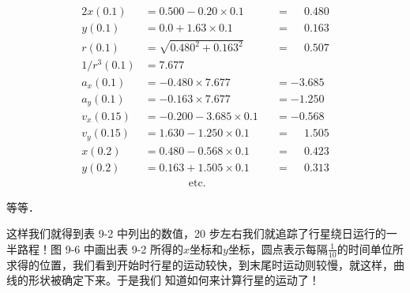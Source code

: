 \documentclass[12pt,oneside]{book}
\begin{document}
\begin{alignat*}{2}
x(0.1)&=0.500-0.20 \times 0.1&&=\phantom{-}0.480\\[.5ex]
y(0.1)&=0.0+1.63 \times 0.1 &&=\phantom{-}0.163\\[.5ex]
r(0.1)&=\sqrt{0.480^2+0.163^2}&&=\phantom{-}0.507\\[.5ex]
1/r^3(0.1)&=7.677 &&\\[.5ex]
a_x(0.1)&=-0.480 \times 7.677 &&=-3.685\\[.5ex]
a_y(0.1)&=-0.163 \times 7.677 &&=-1.250\\[.5ex]
v_x(0.15)&=-0.200-3.685\times0.1 &&=-0.568\\[.5ex]
v_y(0.15)&=1.630-1.250\times0.1 &&=\phantom{-}1.505\\[.5ex]
x(0.2)&=0.480-0.568\times 0.1&&=\phantom{-}0.423\\[.5ex]
y(0.2)&=0.163+1.505\times0.1&&=\phantom{-}0.313\\[.5ex]
&\qquad\qquad\text{etc.}&&
\end{alignat*}

等等．

这样我们就得到表 9-2 中列出的数值，20 步左右我们就追踪了行星绕日运行的一半路程！图 9-6 中画出表 9-2 所得的$x$坐标和$y$坐标，圆点表示每隔$\frac{1}{10}$的时间单位所求得的位置，我们看到开始时行星的运动较快，到末尾时运动则较慢，就这样，曲线的形状被确定下来。于是我们  知道如何来计算行星的运动了！
\end{document}
